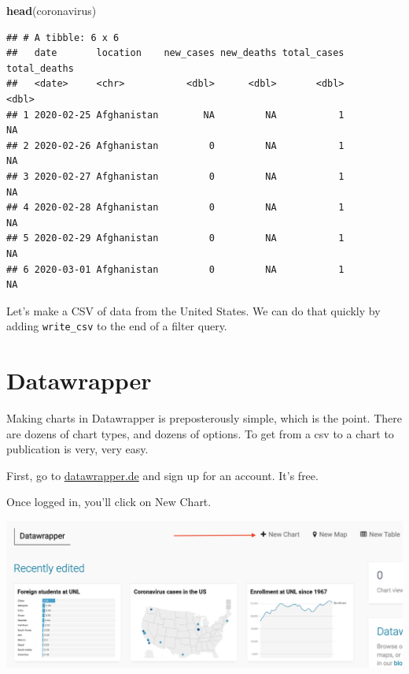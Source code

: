 \documentclass[]{book}
\newenvironment{Shaded}{\begin{snugshade}}{\end{snugshade}}
\newcommand{\KeywordTok}[1]{\textcolor[rgb]{0.13,0.29,0.53}{\textbf{#1}}}
\newcommand{\NormalTok}[1]{#1}
\newcommand{\OperatorTok}[1]{\textcolor[rgb]{0.81,0.36,0.00}{\textbf{#1}}}
\newcommand{\StringTok}[1]{\textcolor[rgb]{0.31,0.60,0.02}{#1}}
\begin{document}
\begin{Shaded}
\begin{Highlighting}[]
\KeywordTok{head}\NormalTok{(coronavirus)}
\end{Highlighting}
\end{Shaded}

\begin{verbatim}
## # A tibble: 6 x 6
##   date       location    new_cases new_deaths total_cases total_deaths
##   <date>     <chr>           <dbl>      <dbl>       <dbl>        <dbl>
## 1 2020-02-25 Afghanistan        NA         NA           1           NA
## 2 2020-02-26 Afghanistan         0         NA           1           NA
## 3 2020-02-27 Afghanistan         0         NA           1           NA
## 4 2020-02-28 Afghanistan         0         NA           1           NA
## 5 2020-02-29 Afghanistan         0         NA           1           NA
## 6 2020-03-01 Afghanistan         0         NA           1           NA
\end{verbatim}

Let's make a CSV of data from the United States. We can do that quickly by adding \texttt{write\_csv} to the end of a filter query.

\begin{Shaded}
\end{Shaded}

\hypertarget{datawrapper}{%
\section{Datawrapper}\label{datawrapper}}

Making charts in Datawrapper is preposterously simple, which is the point. There are dozens of chart types, and dozens of options. To get from a csv to a chart to publication is very, very easy.

First, go to \href{https://www.datawrapper.de/}{datawrapper.de} and sign up for an account. It's free.

Once logged in, you'll click on New Chart.

\includegraphics[width=32.44in]{images/datawrapper1}
\end{document}
